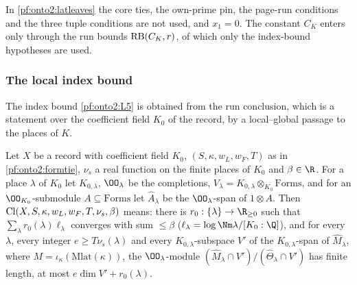 \begin{remark}\label{pf:onto2:rem:latunused}
In \cref{pf:onto2:latleaves} the core ties, the own-prime pin, the page-run conditions and the three tuple conditions are not used,
and $x_1=0$. The constant $C_K$ enters only through the run bounds $\mathrm{RB}(C_K,r)$, of which only the index-bound hypotheses are
used.
\end{remark}

\subsubsection{The local index bound}\label{sec:pf:onto2:index}

The index bound \ref{pf:onto2:L5} is obtained from the run conclusion, which is a statement over the coefficient field $K_0$ of
the record, by a local--global passage to the places of $K$.

\begin{definition}\label{pf:onto2:concl}
Let $X$ be a record with coefficient field $K_0$, $(S,\kappa,w_L,w_F,T)$ as in \cref{pf:onto2:formtie}, $\nu_s$ a real function on
the finite places of $K_0$ and $\beta\in\R$. For a place $\lambda$ of $K_0$ let $K_{0,\lambda}$, $\OO_\lambda$ be the completions,
$V_\lambda=K_{0,\lambda}\otimes_{K_0}\mathrm{Forms}$, and for an $\OO_{K_0}$-submodule $A\subseteq\mathrm{Forms}$ let $\widehat A_\lambda$ be
the $\OO_\lambda$-span of $1\otimes A$. Then $\mathrm{Cl}(X,S,\kappa,w_L,w_F,T,\nu_s,\beta)$
means: there is $r_0:\{\lambda\}\to\R_{\ge0}$ such that
$\sum_\lambda r_0(\lambda)\ell_\lambda$ converges with sum $\le\beta$ ($\ell_\lambda=\log\Nm\lambda/[K_0:\Q]$), and for every $\lambda$,
every integer $e\ge T\nu_s(\lambda)$ and every $K_{0,\lambda}$-subspace $V'$ of the $K_{0,\lambda}$-span of $\widehat{M}_\lambda$, where
$M=\iota_\kappa(\mathrm{Mlat}(\kappa))$, the $\OO_\lambda$-module $(\widehat M_\lambda\cap V')/(\widehat\Theta_\lambda\cap V')$ has finite
length, at most $e\dim V'+r_0(\lambda)$.
\end{definition}

